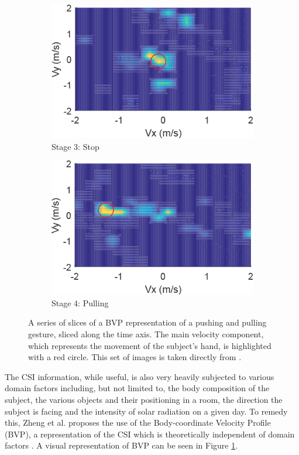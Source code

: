 \begin{figure}[t]
\begin{subfigure}{0.22\textwidth}
		\includegraphics[width=\textwidth]{figures/bvp_stage_3_stop}
		\caption{Stage 3: Stop}
	\end{subfigure}
	\hfill
	\begin{subfigure}{0.22\textwidth}
		\centering
		\includegraphics[width=\textwidth]{figures/bvp_stage_4_pulling}
		\caption{Stage 4: Pulling}
	\end{subfigure}
	\caption{A series of slices of a BVP representation of a pushing and pulling gesture, sliced along the time axis. The main velocity component, which represents the movement of the subject's hand, is highlighted with a red circle. This set of images is taken directly from \cite{zheng2019zero}.}
	\label{fig:bvp-example}
\end{figure}

The CSI information, while useful, is also very heavily subjected to various domain factors including, but not limited to, the body composition of the subject, the various objects and their positioning in a room, the direction the subject is facing and the intensity of solar radiation on a given day.
To remedy this, Zheng et al. \cite{zheng2019zero} proposes the use of the Body-coordinate Velocity Profile (BVP), a representation of the CSI which is theoretically independent of domain factors \cite{zheng2019zero}.
A visual representation of BVP can be seen in Figure \ref{fig:bvp-example}.

